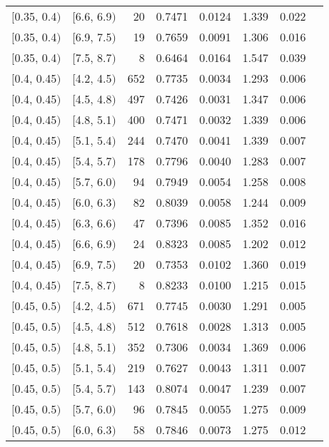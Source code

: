 \begin{longtable}{| l | l | r | r | r | r | r | r |}
        $[$0.35, 0.4$)$ & $[$6.6, 6.9$)$ & 20  & 0.7471 & 0.0124 & 1.339 & 0.022 \\
        $[$0.35, 0.4$)$ & $[$6.9, 7.5$)$ & 19  & 0.7659 & 0.0091 & 1.306 & 0.016 \\
        $[$0.35, 0.4$)$ & $[$7.5, 8.7$)$ & 8   & 0.6464 & 0.0164 & 1.547 & 0.039 \\
        $[$0.4, 0.45$)$ & $[$4.2, 4.5$)$ & 652 & 0.7735 & 0.0034 & 1.293 & 0.006 \\
        $[$0.4, 0.45$)$ & $[$4.5, 4.8$)$ & 497 & 0.7426 & 0.0031 & 1.347 & 0.006 \\
        $[$0.4, 0.45$)$ & $[$4.8, 5.1$)$ & 400 & 0.7471 & 0.0032 & 1.339 & 0.006 \\
        $[$0.4, 0.45$)$ & $[$5.1, 5.4$)$ & 244 & 0.7470 & 0.0041 & 1.339 & 0.007 \\
        $[$0.4, 0.45$)$ & $[$5.4, 5.7$)$ & 178 & 0.7796 & 0.0040 & 1.283 & 0.007 \\
        $[$0.4, 0.45$)$ & $[$5.7, 6.0$)$ & 94  & 0.7949 & 0.0054 & 1.258 & 0.008 \\
        $[$0.4, 0.45$)$ & $[$6.0, 6.3$)$ & 82  & 0.8039 & 0.0058 & 1.244 & 0.009 \\
        $[$0.4, 0.45$)$ & $[$6.3, 6.6$)$ & 47  & 0.7396 & 0.0085 & 1.352 & 0.016 \\
        $[$0.4, 0.45$)$ & $[$6.6, 6.9$)$ & 24  & 0.8323 & 0.0085 & 1.202 & 0.012 \\
        $[$0.4, 0.45$)$ & $[$6.9, 7.5$)$ & 20  & 0.7353 & 0.0102 & 1.360 & 0.019 \\
        $[$0.4, 0.45$)$ & $[$7.5, 8.7$)$ & 8   & 0.8233 & 0.0100 & 1.215 & 0.015 \\
        $[$0.45, 0.5$)$ & $[$4.2, 4.5$)$ & 671 & 0.7745 & 0.0030 & 1.291 & 0.005 \\
        $[$0.45, 0.5$)$ & $[$4.5, 4.8$)$ & 512 & 0.7618 & 0.0028 & 1.313 & 0.005 \\
        $[$0.45, 0.5$)$ & $[$4.8, 5.1$)$ & 352 & 0.7306 & 0.0034 & 1.369 & 0.006 \\
        $[$0.45, 0.5$)$ & $[$5.1, 5.4$)$ & 219 & 0.7627 & 0.0043 & 1.311 & 0.007 \\
        $[$0.45, 0.5$)$ & $[$5.4, 5.7$)$ & 143 & 0.8074 & 0.0047 & 1.239 & 0.007 \\
        $[$0.45, 0.5$)$ & $[$5.7, 6.0$)$ & 96  & 0.7845 & 0.0055 & 1.275 & 0.009 \\
        $[$0.45, 0.5$)$ & $[$6.0, 6.3$)$ & 58  & 0.7846 & 0.0073 & 1.275 & 0.012 \\

\end{longtable}
